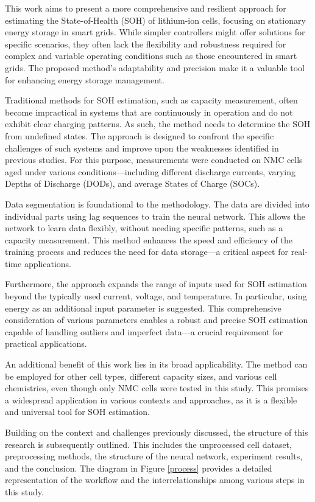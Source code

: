 \documentclass[energies,article,accept,pdftex,moreauthors]{Definitions/mdpi}
\begin{document}
This work aims to present a more comprehensive and resilient approach for estimating the State-of-Health (SOH) of lithium-ion cells, focusing on stationary energy storage in smart grids. While simpler controllers might offer solutions for specific scenarios, they often lack the flexibility and robustness required for complex and variable operating conditions such as those encountered in smart grids. The proposed method's adaptability and precision make it a valuable tool for enhancing energy storage management. %

Traditional methods for SOH estimation, such as capacity measurement, often become impractical in systems that are continuously in operation and do not exhibit clear charging patterns. As such, the method needs to determine the SOH from undefined states. The approach is designed to confront the specific challenges of such systems and improve upon the weaknesses identified in previous studies. For this purpose, measurements were conducted on NMC cells aged under various conditions---including different discharge currents, varying Depths of Discharge (DODs), and average States of Charge (SOCs).

Data segmentation is foundational to the methodology. The data are divided into individual parts using lag sequences to train the neural network. This allows the network to learn data flexibly, without needing specific patterns, such as a capacity measurement. This method enhances the speed and efficiency of the training process and reduces the need for data storage---a critical aspect for real-time applications.

Furthermore, the approach expands the range of inputs used for SOH estimation beyond the typically used current, voltage, and temperature. In particular, using energy as an additional input parameter is suggested. This comprehensive consideration of various parameters enables a robust and precise SOH estimation capable of handling outliers and imperfect data---a crucial requirement for practical applications.

An additional benefit of this work lies in its broad applicability. The method can be employed for other cell types, different capacity sizes, and various cell chemistries, even though only NMC cells were tested in this study. This promises a widespread application in various contexts and approaches, as it is a flexible and universal tool for SOH estimation. %

Building on the context and challenges previously discussed, the structure of this research is subsequently outlined. This includes the unprocessed cell dataset, preprocessing methods, the structure of the neural network, experiment results, and the conclusion. The diagram in Figure \ref{process} provides a detailed representation of the workflow and the interrelationships among various steps in this study.
\end{document}
